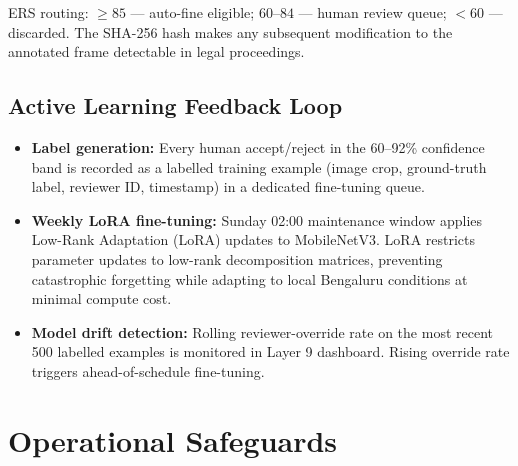 \documentclass[11pt,a4paper]{article}
\begin{document}
ERS routing: $\geq 85$ — auto-fine eligible; $60$--$84$ — human review queue; $< 60$ — discarded. The SHA-256 hash makes any subsequent modification to the annotated frame detectable in legal proceedings.

\subsection*{Active Learning Feedback Loop}

\begin{itemize}[leftmargin=1.8em, itemsep=0.2em]
    \item \textbf{Label generation:} Every human accept/reject in the 60--92\% confidence band is recorded as a labelled training example (image crop, ground-truth label, reviewer ID, timestamp) in a dedicated fine-tuning queue.
    \item \textbf{Weekly LoRA fine-tuning:} Sunday 02:00 maintenance window applies Low-Rank Adaptation (LoRA) updates to MobileNetV3. LoRA restricts parameter updates to low-rank decomposition matrices, preventing catastrophic forgetting while adapting to local Bengaluru conditions at minimal compute cost.
    \item \textbf{Model drift detection:} Rolling reviewer-override rate on the most recent 500 labelled examples is monitored in Layer 9 dashboard. Rising override rate triggers ahead-of-schedule fine-tuning.
\end{itemize}

\section{Operational Safeguards}
\end{document}
